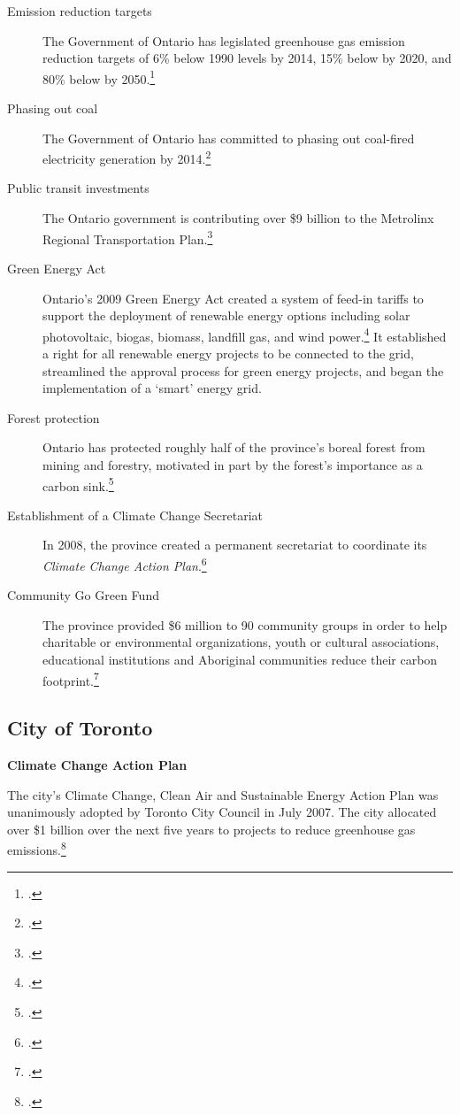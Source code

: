 \begin{description}
	\item[Emission reduction targets] The Government of Ontario has legislated greenhouse gas emission reduction targets of 6\% below 1990 levels by 2014, 15\% below by 2020, and 80\% below by 2050.\footcite[][]{OMEGreening}
	\item[Phasing out coal] The Government of Ontario has committed to phasing out coal-fired electricity generation by 2014.\footcite[][]{EPACessation}
	\item[Public transit investments] The Ontario government is contributing over \$9 billion to the Metrolinx Regional Transportation Plan.\footcite[][]{OMEGreening}
	\item[Green Energy Act] Ontario's 2009 Green Energy Act created a system of feed-in tariffs to support the deployment of renewable energy options including solar photovoltaic, biogas, biomass, landfill gas, and wind power.\footcite[][]{OMEGreen} 
It established a right for all renewable energy projects to be connected to the grid, streamlined the approval process for green energy projects, and began the implementation of a `smart' energy grid.
	\item[Forest protection] Ontario has protected roughly half of the province's boreal forest from mining and forestry, motivated in part by the forest's importance as a carbon sink.\footcite[][]{RobbingCarbonBank}
	\item[Establishment of a Climate Change Secretariat] In 2008, the province created a permanent secretariat to coordinate its \emph{Climate Change Action Plan}.\footcite[][]{OMEGreening}
	\item[Community Go Green Fund] The province provided \$6 million to 90 community groups in order to help charitable or environmental organizations, youth or cultural associations, educational institutions and Aboriginal communities reduce their carbon footprint.\footcite[][]{OMEGreening}
\end{description}	



	\subsection{City of Toronto}



\textbf{Climate Change Action Plan}



The city's Climate Change, Clean Air and Sustainable Energy Action Plan was unanimously adopted by Toronto City Council in July 2007. The city allocated over \$1 billion over the next five years to projects to reduce greenhouse gas emissions.\footcite{TorontoEnvOff2007}



